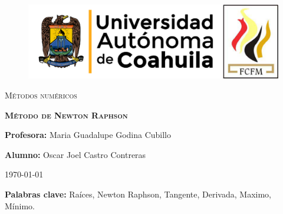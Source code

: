 \documentclass[12pt]{article}
\begin{document}
		
		\begin{titlepage}
		
			\centering
			{\bfseries
			\begin{figure}[h!]
				\centering
				\includegraphics[width=\linewidth]{Nom_UAdeC_FCFM.png} 				
			\end{figure}
			\par}
			\vspace{2cm}
			{\scshape\LARGE Métodos numéricos \par}
			\vspace{3cm}
			{\scshape\Huge \textbf{Método de Newton Raphson} \par}
			\vfill
			{\LARGE \textbf{Profesora:} Maria Guadalupe Godina Cubillo \par}
			\vspace{3cm}
			{\LARGE \textbf{Alumno:} Oscar Joel Castro Contreras \par}
			\vfill
			{\Large \today \par}
			\thispagestyle{empty}
			
		\end{titlepage}
	
		\newpage

		\begin{abstract}
			\noindent En este reporte explico un poco de los métodos que existen para encontrar las raíces de cualquier 
			polinomio o función que tenga raíces, y en específico explico, qué es, en que consiste y cuales son las 
			limitaciones del método de Newton Raphson para encontrar raíces.
		\end{abstract}

		\textbf{Palabras clave:} Raíces, Newton Raphson, Tangente, Derivada, Maximo, Mínimo.
\end{document}
